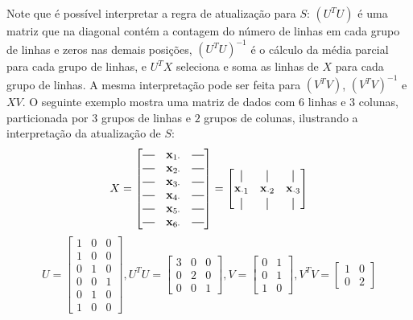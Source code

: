 \documentclass[
    12pt,                %
    oneside,            %
    a4paper,            %
    english,            %
    brazil                %
    ]{abntex2ppgsi}
\newcommand*{\horzbar}{\rule[.5ex]{2.5ex}{0.5pt}}
\newcommand*{\vertbar}{\rule[-1ex]{0.5pt}{2.5ex}}
\begin{document}
Note que é possível interpretar a regra de atualização para $S$: $(U^T U)$ é uma matriz que na diagonal contém a contagem do número de linhas em cada grupo de linhas e zeros nas demais posições, $(U^T U)^{-1}$ é o cálculo da média parcial para cada grupo de linhas, e $U^T X$ seleciona e soma as linhas de $X$ para cada grupo de linhas.
A mesma interpretação pode ser feita para $(V^T V)$, $(V^T V)^{-1}$ e $XV$.
O seguinte exemplo mostra uma matriz de dados com $6$ linhas e $3$ colunas, particionada por $3$ grupos de linhas e $2$ grupos de colunas, ilustrando a interpretação da atualização de $S$:
\[
X = \begin{bmatrix}
\horzbar & \mathbf{x}_{1 \cdot} & \horzbar \\
\horzbar & \mathbf{x}_{2 \cdot} & \horzbar \\
\horzbar & \mathbf{x}_{3 \cdot} & \horzbar \\
\horzbar & \mathbf{x}_{4 \cdot} & \horzbar \\
\horzbar & \mathbf{x}_{5 \cdot} & \horzbar \\
\horzbar & \mathbf{x}_{6 \cdot} & \horzbar
\end{bmatrix}
= \begin{bmatrix}
\vertbar             & \vertbar             & \vertbar             \\
\mathbf{x}_{\cdot 1} & \mathbf{x}_{\cdot 2} & \mathbf{x}_{\cdot 3} \\
\vertbar             & \vertbar             & \vertbar
\end{bmatrix}
\]
\[
U = \begin{bmatrix}
1 & 0 & 0 \\
1 & 0 & 0 \\
0 & 1 & 0 \\
0 & 0 & 1 \\
0 & 1 & 0 \\
1 & 0 & 0
\end{bmatrix},
U^T U = \begin{bmatrix}
3 & 0 & 0 \\
0 & 2 & 0 \\
0 & 0 & 1
\end{bmatrix},
V = \begin{bmatrix}
0 & 1 \\
0 & 1 \\
1 & 0
\end{bmatrix},
V^T V = \begin{bmatrix}
1 & 0 \\
0 & 2
\end{bmatrix}
\]
\end{document}
